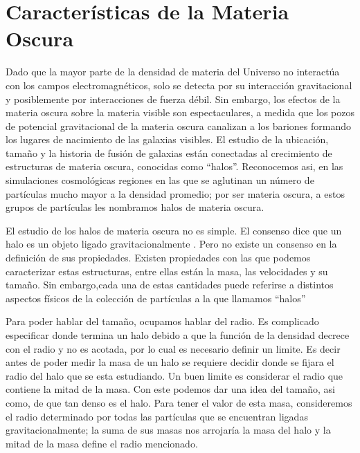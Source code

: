 \section{Características de la Materia Oscura}

Dado que la mayor parte de la densidad de materia del Universo no interactúa con los campos electromagnéticos, solo se detecta por su interacción gravitacional y posiblemente por interacciones de fuerza débil. Sin embargo, los efectos de la materia oscura sobre la materia visible son espectaculares, a medida que los pozos de potencial gravitacional de la materia oscura canalizan a los bariones formando los lugares de nacimiento de las galaxias visibles. El estudio de la ubicación, tamaño y la historia de fusión de galaxias están conectadas al crecimiento de estructuras de materia oscura, conocidas como ``halos''. Reconocemos asi, en las simulaciones cosmológicas regiones en las que se aglutinan un número de partículas mucho mayor a la densidad promedio; por ser materia oscura, a estos grupos de partículas les nombramos halos de materia oscura.

El estudio de los halos de materia oscura no es simple.  El consenso dice que un halo es un objeto ligado gravitacionalmente \cite{2011MNRAS.415.2293K}. Pero no existe un consenso en la definición de sus propiedades. Existen propiedades con las que podemos caracterizar estas estructuras, entre ellas están la masa, las velocidades y su tamaño. Sin embargo,cada una de estas cantidades puede referirse a distintos aspectos físicos de la colección de partículas a la que llamamos ``halos''

Para poder hablar del tamaño, ocupamos hablar del radio. Es complicado especificar donde termina un halo debido a que la función de la densidad decrece con el radio y no es acotada, por lo cual es necesario definir un limite. Es decir antes de poder medir la masa de un halo se requiere decidir donde se fijara el radio del halo que se esta estudiando. Un buen limite es considerar el radio que contiene la mitad de la masa. Con este podemos dar una idea del tamaño, asi como, de que tan denso es el halo. Para tener el valor de esta masa, consideremos el radio determinado por todas las partículas que se encuentran ligadas gravitacionalmente; la suma de sus masas nos arrojaría la masa del halo y la mitad de la masa define el radio mencionado.

